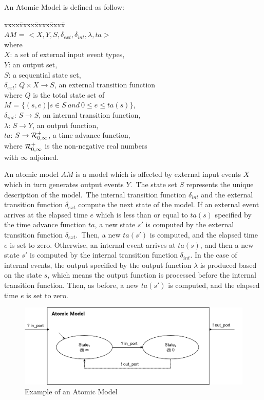 \documentclass{scsSimAUDPaperFormat}
\begin{document}
An Atomic Model is defined as follow:
\begin{tabbing}
xxxx\=xxxx\=xxxx\=xxxx\=\kill\\
\> \> \> $AM$ = $<X, Y, S, \delta_{ext}, \delta_{int}, \lambda, ta>$\\
where\\
\> $X$: a set of external input event types,\\
\> $Y$: an output set,\\
\> $S$: a sequential state set,\\
\> $\delta_{ext}$: $Q \times X \rightarrow S$, an external transition function\\
\> \> where $Q$ is the total state set of \\
\> \> $M$ = $\{(s,e)|s \in S\:and\:0 \leq e \leq ta(s)\}$,\\
\> $\delta_{int}$: $S \rightarrow S$, an internal transition function,\\
\> $\lambda$: $S \rightarrow Y$, an output function,\\
\> $ta$: $S \rightarrow {\cal R}^{+}_{0,\infty}$, a time advance function, \\
\> \> where ${\cal R}^{+}_{0,\infty}$ is the non-negative real numbers \\
\> \> with $\infty$ adjoined.
\end{tabbing}

An atomic model $AM$ is a model which is affected by external input events
$X$ which in turn generates output events $Y$.~The state set $S$ represents the unique description of the model.~The internal transition function $\delta_{int}$ and the external transition
function $\delta_{ext}$ compute the next state of the model.
If an external event arrives at the elapsed time $e$ which is less than or
equal to $ta(s)$ specified by the time advance function $ta$, a new
state $s'$ is computed by the external transition function $\delta_{ext}$.~Then, a new $ta(s')$ is computed, and the elapsed time $e$ is set to zero.
Otherwise, an internal event arrives at $ta(s)$, and then a new state
$s'$ is computed by the internal transition function $\delta_{int}$.
In the case of internal events, the output specified by the output function
$\lambda$ is produced based on the state $s$, which means the output function
is processed before the internal transition function.
Then, as before, a new $ta(s')$ is computed, and the elapsed time $e$ is set to zero. 

\begin{figure}[!h]
    \centering
    \includegraphics[width=1.0\columnwidth]{fig/Atomic_model}
    \caption{Example of an Atomic Model}
    \label{Fig:AtomicModel}
\end{figure}
\end{document}
